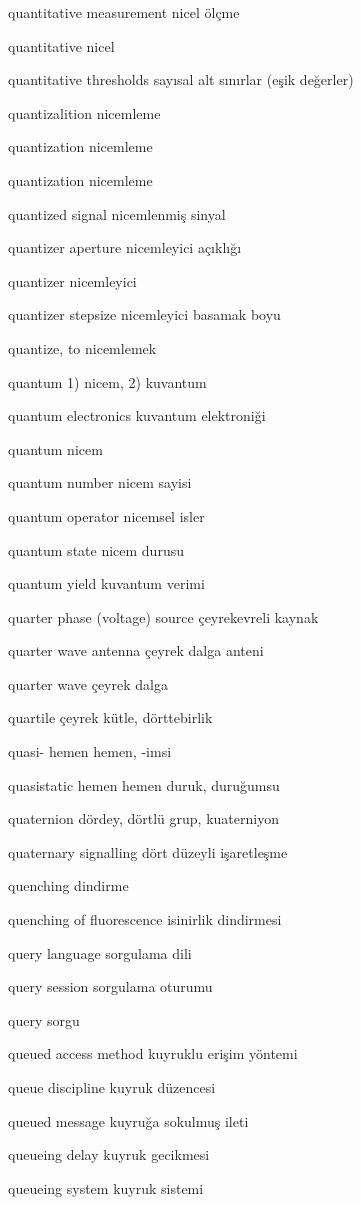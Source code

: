 \documentclass[12pt,fleqn]{article}\usepackage{../../common}
\begin{document}
quantitative measurement nicel ölçme

quantitative nicel

quantitative thresholds sayısal alt sınırlar (eşik değerler)

quantizalition nicemleme

quantization nicemleme

quantization nicemleme

quantized signal nicemlenmiş sinyal

quantizer aperture nicemleyici açıklığı

quantizer nicemleyici

quantizer stepsize nicemleyici basamak boyu

quantize, to nicemlemek

quantum 1) nicem, 2) kuvantum

quantum electronics kuvantum elektroniği

quantum nicem

quantum number nicem sayisi

quantum operator nicemsel isler

quantum state nicem durusu

quantum yield kuvantum verimi

quarter phase (voltage) source çeyrekevreli kaynak

quarter wave antenna çeyrek dalga anteni

quarter wave çeyrek dalga

quartile çeyrek kütle, dörttebirlik

quasi- hemen hemen, -imsi

quasistatic hemen hemen duruk, duruğumsu

quaternion dördey, dörtlü grup, kuaterniyon

quaternary signalling dört düzeyli işaretleşme

quenching dindirme

quenching of fluorescence isinirlik dindirmesi

query language sorgulama dili

query session sorgulama oturumu

query sorgu

queued access method kuyruklu erişim yöntemi

queue discipline kuyruk düzencesi

queued message kuyruğa sokulmuş ileti

queueing delay kuyruk gecikmesi

queueing system kuyruk sistemi
\end{document}
